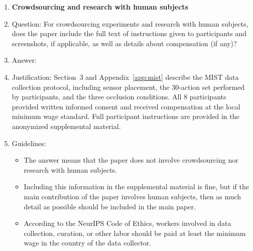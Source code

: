 \begin{enumerate}
\item {\bf Crowdsourcing and research with human subjects}
    \item[] Question: For crowdsourcing experiments and research with human subjects, does the paper include the full text of instructions given to participants and screenshots, if applicable, as well as details about compensation (if any)?
    \item[] Answer: \answerYes{}
    \item[] Justification: Section~3 and Appendix~\ref{app:mist} describe the MIST data collection protocol, including sensor placement, the 30-action set performed by participants, and the three occlusion conditions. All 8 participants provided written informed consent and received compensation at the local minimum wage standard. Full participant instructions are provided in the anonymized supplemental material.
    \item[] Guidelines:
    \begin{itemize}
        \item The answer \answerNA{} means that the paper does not involve crowdsourcing nor research with human subjects.
        \item Including this information in the supplemental material is fine, but if the main contribution of the paper involves human subjects, then as much detail as possible should be included in the main paper.
        \item According to the NeurIPS Code of Ethics, workers involved in data collection, curation, or other labor should be paid at least the minimum wage in the country of the data collector.
    \end{itemize}


\end{enumerate}
